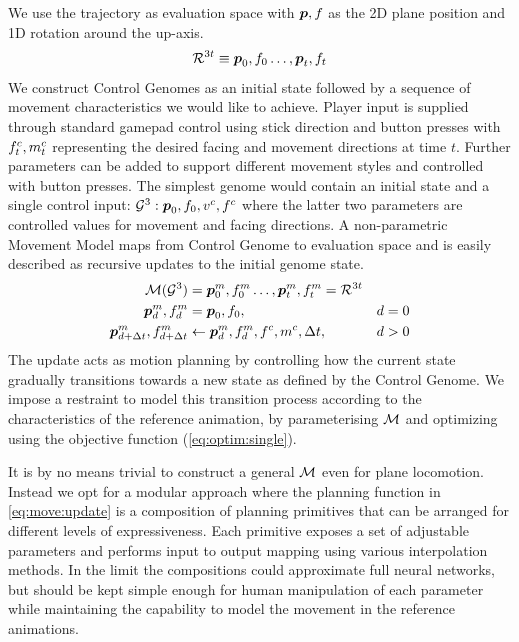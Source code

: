 We use the trajectory as evaluation space with $\boldsymbol{p },f$ as the 2D plane position and 1D rotation around the up-axis.
\begin{align}
\mathcal{R}^{3t}\equiv\boldsymbol{p }_0,f_0\ldots,\boldsymbol{p }_t,f_t
\end{align}
We construct Control Genomes as an initial state followed by a sequence of movement characteristics we would like to achieve. Player input is supplied through standard gamepad control using stick direction and button presses with $f^c_t, m^c_t$ representing the desired facing and movement directions at time $t$. Further parameters can be added to support different movement styles and controlled with button presses. The simplest genome would contain an initial state and a single control input: $\mathcal{G}^3:\boldsymbol{p }_0,f_0,v^c,f^c$ where the latter two parameters are controlled values for movement and facing directions. A non-parametric Movement Model maps from Control Genome to evaluation space and is easily described as recursive updates to the initial genome state.
\begin{subequations}
\begin{align}
    \mathcal{M}(\mathcal{G}^3)
    &=\boldsymbol{p }_0^m,f_0^m\ldots,\boldsymbol{p }_t^m,f_t^m=\mathcal{R}^{3t}&
    \\
    \boldsymbol{p }_d^m,f_d^m
    &=\boldsymbol{p }_0,f_0,&d=0
    \\
    \boldsymbol{p }_{d+\Delta{t}}^m,f_{d+\Delta{t}}^m
    &\leftarrow\boldsymbol{p }_d^m,f_d^m,f^c,m^c,\Delta{t}\label{eq:move:update},&d>0
\end{align}
\end{subequations}
The update  acts as motion planning by controlling how the current state gradually transitions towards a new state as defined by the Control Genome. We impose a restraint to model this transition process according to the characteristics of the reference animation, by parameterising $\mathcal{M}$ and optimizing using the objective function (\ref{eq:optim:single}). 

It is by no means trivial to construct a general $\mathcal{M}$ even for plane locomotion. Instead we opt for a modular approach where the planning function in \ref{eq:move:update} is a composition of planning primitives that can be arranged for different levels of expressiveness. Each primitive exposes a set of adjustable parameters and performs input to output mapping using various interpolation methods. In the limit the compositions could approximate full neural networks, but should be kept simple enough for human manipulation of each parameter while maintaining the capability to model the movement in the reference animations.     

